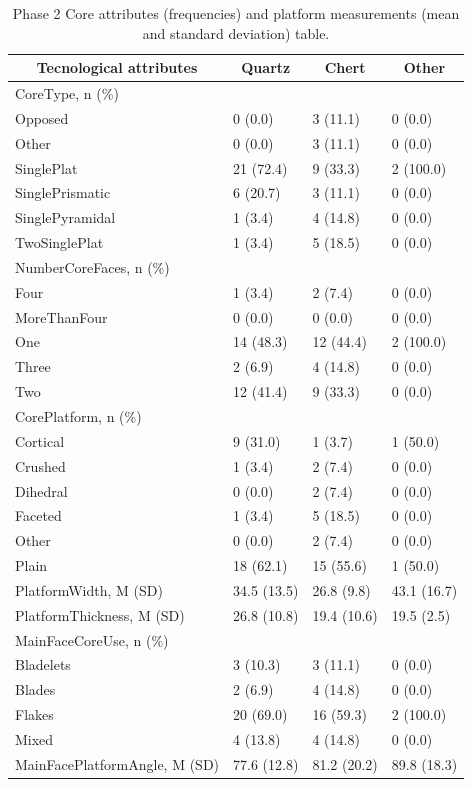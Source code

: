 \documentclass[12pt,twoside]{reedthesis}
\begin{document}
\begin{longtable}[t]{llll}
\caption{\label{tab:unnamed-chunk-58}Phase 2 Core attributes (frequencies) and platform measurements (mean and standard deviation) table.}\\
\toprule
\multicolumn{1}{c}{\textbf{Tecnological attributes}} & \multicolumn{1}{c}{\textbf{Quartz}} & \multicolumn{1}{c}{\textbf{Chert}} & \multicolumn{1}{c}{\textbf{Other}}\\
\midrule
CoreType, n (\%) &  &  & \\
Opposed & 0 (0.0) & 3 (11.1) & 0 (0.0)\\
Other & 0 (0.0) & 3 (11.1) & 0 (0.0)\\
SinglePlat & 21 (72.4) & 9 (33.3) & 2 (100.0)\\
SinglePrismatic & 6 (20.7) & 3 (11.1) & 0 (0.0)\\
\addlinespace
SinglePyramidal & 1 (3.4) & 4 (14.8) & 0 (0.0)\\
TwoSinglePlat & 1 (3.4) & 5 (18.5) & 0 (0.0)\\
NumberCoreFaces, n (\%) &  &  & \\
Four & 1 (3.4) & 2 (7.4) & 0 (0.0)\\
MoreThanFour & 0 (0.0) & 0 (0.0) & 0 (0.0)\\
\addlinespace
One & 14 (48.3) & 12 (44.4) & 2 (100.0)\\
Three & 2 (6.9) & 4 (14.8) & 0 (0.0)\\
Two & 12 (41.4) & 9 (33.3) & 0 (0.0)\\
CorePlatform, n (\%) &  &  & \\
Cortical & 9 (31.0) & 1 (3.7) & 1 (50.0)\\
\addlinespace
Crushed & 1 (3.4) & 2 (7.4) & 0 (0.0)\\
Dihedral & 0 (0.0) & 2 (7.4) & 0 (0.0)\\
Faceted & 1 (3.4) & 5 (18.5) & 0 (0.0)\\
Other & 0 (0.0) & 2 (7.4) & 0 (0.0)\\
Plain & 18 (62.1) & 15 (55.6) & 1 (50.0)\\
\addlinespace
PlatformWidth, M (SD) & 34.5 (13.5) & 26.8 (9.8) & 43.1 (16.7)\\
PlatformThickness, M (SD) & 26.8 (10.8) & 19.4 (10.6) & 19.5 (2.5)\\
MainFaceCoreUse, n (\%) &  &  & \\
Bladelets & 3 (10.3) & 3 (11.1) & 0 (0.0)\\
Blades & 2 (6.9) & 4 (14.8) & 0 (0.0)\\
\addlinespace
Flakes & 20 (69.0) & 16 (59.3) & 2 (100.0)\\
Mixed & 4 (13.8) & 4 (14.8) & 0 (0.0)\\
MainFacePlatformAngle, M (SD) & 77.6 (12.8) & 81.2 (20.2) & 89.8 (18.3)\\
\bottomrule
\end{longtable}
\end{document}
